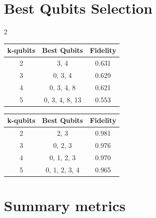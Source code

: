 \documentclass[9pt,a4paper]{src/templates/tau-class/tau}
\begin{document}
\renewcommand{\arraystretch}{1.0}

\section{Best Qubits Selection}

\begin{multicols}{2}

\begin{center}
\begin{tabular}{@{}c c c@{}}
\toprule
k-qubits & Best Qubits & Fidelity \\ \midrule
2 & 3, 4 & 0.631 \\
3 & 0, 3, 4 & 0.629 \\
4 & 0, 3, 4, 8 & 0.621 \\
5 & 0, 3, 4, 8, 13 & 0.553 \\
\bottomrule
\end{tabular}
\end{center}

\columnbreak

\begin{center}
\begin{tabular}{@{}c c c@{}}
\toprule
k-qubits & Best Qubits & Fidelity \\ \midrule
2 & 2, 3 & 0.981 \\
3 & 0, 2, 3 & 0.976 \\
4 & 0, 1, 2, 3 & 0.970 \\
5 & 0, 1, 2, 3, 4 & 0.965 \\
\bottomrule
\end{tabular}
\end{center}

\end{multicols}


\section{Summary metrics}
\end{document}
